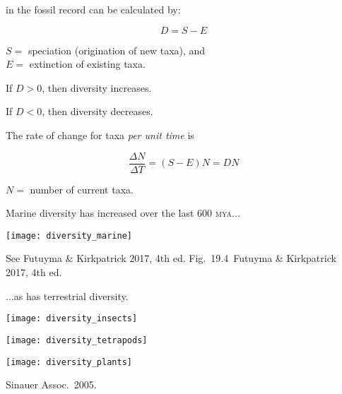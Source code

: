 \documentclass[t]{beamer}
\newcommand{\futuyma}[1]{%
	\ifthenelse{\isempty{#1}}%
	{Futuyma \& Kirkpatrick 2017, 4th ed.}%
	{Fig.~#1~Futuyma \& Kirkpatrick 2017, 4th ed.}%
}
\newcommand{\backskip}{\vspace{-0.5\baselineskip}}
\begin{document}

\begin{frame}{ in the fossil record can be calculated by:}

\vspace*{-2\baselineskip}

{\Large
\begin{equation*}
D = S - E
\end{equation*}
}%


\hangpara $S =$ speciation (origination of new taxa),
and\\
$E =$ extinction of existing taxa.

\medskip


\hangpara If $D > 0$, then diversity increases. 

\hangpara If $D < 0$, then diversity
decreases.

\end{frame}


\begin{frame}{The rate of change for taxa \emph{per unit time} is}

\vspace*{-\baselineskip}

{\Large
\begin{equation*}
\dfrac{\Delta N}{\Delta T} = \left(S - E\right)N = DN
\end{equation*}
}%


\hangpara $N =$ number of current taxa.


\end{frame}


\begin{frame}{Marine diversity has increased over the last 600 \textsc{mya}$\dots$}

\backskip

\centering

\texttt{[image: diversity\_marine]}
	
\tinyfill See \futuyma{19.4}

\end{frame}


\begin{frame}{$\dots$as has terrestrial diversity.}

\backskip

\begin{multicols}{2}

\centering

\texttt{[image: diversity\_insects]}

\smallskip

\texttt{[image: diversity\_tetrapods]}

\columnbreak

\texttt{[image: diversity\_plants]}
\end{multicols}

\tinyfill \textcopyright Sinauer Assoc.~2005.
\end{frame}
\end{document}
